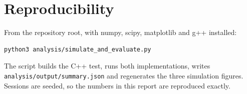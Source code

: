 \documentclass[11pt,letterpaper]{article}
\begin{document}
\section{Reproducibility}\label{app:repro}
From the repository root, with numpy, scipy, matplotlib and g++ installed:
\begin{lstlisting}
python3 analysis/simulate_and_evaluate.py
\end{lstlisting}
The script builds the C++ test, runs both implementations, writes \texttt{analysis/output/summary.json} and regenerates the three simulation figures. Sessions are seeded, so the numbers in this report are reproduced exactly.
\end{document}
